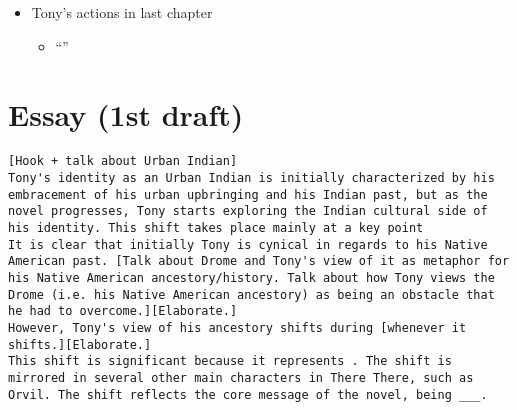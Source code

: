 \documentclass[letterpaper]{article}
\begin{document}
\begin{itemize}
\begin{itemize}
\begin{itemize}
\begin{itemize}
\item To Tony (and other Urban Indians), embracing Indian culture
(i.e. regalia) helps with overcoming the Drome (i.e. Urban
Indian burden).
\end{itemize}

\item Tony's actions in last chapter

\begin{itemize}
\item “”
\end{itemize}
\end{itemize}
\end{itemize}
\end{itemize}

\section{Essay (1st draft)}
\label{sec:org20f2395}
\begin{verbatim}
[Hook + talk about Urban Indian]
Tony's identity as an Urban Indian is initially characterized by his embracement of his urban upbringing and his Indian past, but as the novel progresses, Tony starts exploring the Indian cultural side of his identity. This shift takes place mainly at a key point 
It is clear that initially Tony is cynical in regards to his Native American past. [Talk about Drome and Tony's view of it as metaphor for his Native American ancestory/history. Talk about how Tony views the Drome (i.e. his Native American ancestory) as being an obstacle that he had to overcome.][Elaborate.]
However, Tony's view of his ancestory shifts during [whenever it shifts.][Elaborate.]
This shift is significant because it represents . The shift is mirrored in several other main characters in There There, such as Orvil. The shift reflects the core message of the novel, being ___.
\end{verbatim}
\end{document}
